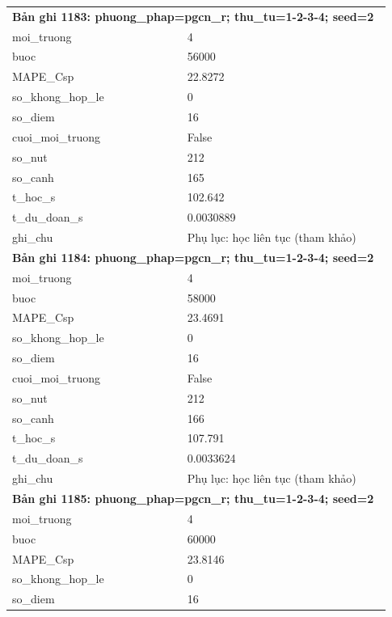 \begin{longtable}{p{0.43\linewidth}p{0.50\linewidth}}
\midrule
\multicolumn{2}{p{0.95\linewidth}}{\textbf{Bản ghi 1183: phuong\_phap=pgcn\_r; thu\_tu=1-2-3-4; seed=2}} \\
moi\_\allowbreak truong & 4 \\
buoc & 56000 \\
MAPE\_\allowbreak Csp & 22.8272 \\
so\_\allowbreak khong\_\allowbreak hop\_\allowbreak le & 0 \\
so\_\allowbreak diem & 16 \\
cuoi\_\allowbreak moi\_\allowbreak truong & False \\
so\_\allowbreak nut & 212 \\
so\_\allowbreak canh & 165 \\
t\_\allowbreak hoc\_\allowbreak s & 102.642 \\
t\_\allowbreak du\_\allowbreak doan\_\allowbreak s & 0.0030889 \\
ghi\_\allowbreak chu & Phụ lục: học liên tục (tham khảo) \\
\midrule
\multicolumn{2}{p{0.95\linewidth}}{\textbf{Bản ghi 1184: phuong\_phap=pgcn\_r; thu\_tu=1-2-3-4; seed=2}} \\
moi\_\allowbreak truong & 4 \\
buoc & 58000 \\
MAPE\_\allowbreak Csp & 23.4691 \\
so\_\allowbreak khong\_\allowbreak hop\_\allowbreak le & 0 \\
so\_\allowbreak diem & 16 \\
cuoi\_\allowbreak moi\_\allowbreak truong & False \\
so\_\allowbreak nut & 212 \\
so\_\allowbreak canh & 166 \\
t\_\allowbreak hoc\_\allowbreak s & 107.791 \\
t\_\allowbreak du\_\allowbreak doan\_\allowbreak s & 0.0033624 \\
ghi\_\allowbreak chu & Phụ lục: học liên tục (tham khảo) \\
\midrule
\multicolumn{2}{p{0.95\linewidth}}{\textbf{Bản ghi 1185: phuong\_phap=pgcn\_r; thu\_tu=1-2-3-4; seed=2}} \\
moi\_\allowbreak truong & 4 \\
buoc & 60000 \\
MAPE\_\allowbreak Csp & 23.8146 \\
so\_\allowbreak khong\_\allowbreak hop\_\allowbreak le & 0 \\
so\_\allowbreak diem & 16 \\

\end{longtable}

